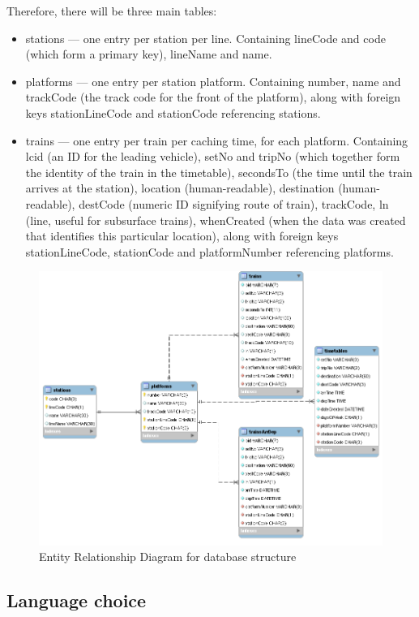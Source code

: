 \documentclass[a4paper,12pt]{article}
\begin{document}
Therefore, there will be three main tables:
\begin{itemize}
  \item stations --- one entry per station per line. Containing lineCode and
    code (which form a primary key), lineName and name.
  \item platforms --- one entry per station platform. Containing number, name
    and trackCode (the track code for the front of the platform), along with
    foreign keys stationLineCode and stationCode referencing stations.
  \item trains --- one entry per train per caching time, for each platform.
    Containing lcid (an ID for the leading vehicle), setNo and tripNo (which
    together form the identity of the train in the timetable), secondsTo (the
    time until the train arrives at the station), location (human-readable),
    destination (human-readable), destCode (numeric ID signifying route of
    train), trackCode, ln (line, useful for subsurface trains), whenCreated
    (when the data was created that identifies this particular location), along
    with foreign keys stationLineCode, stationCode and platformNumber
    referencing platforms.
\end{itemize}

\begin{figure}[h]
  \centering
  \includegraphics[width=\linewidth]{erd}
  \caption{Entity Relationship Diagram for database structure}
  \label{fig:erd}
\end{figure}

\subsection{Language choice}
\end{document}
